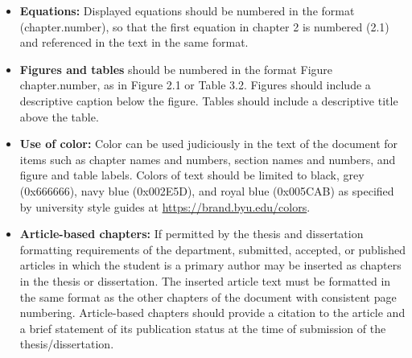 \begin{itemize}
\item {\bfseries Equations:} Displayed equations should be numbered in the format (chapter.number), so that the first equation in chapter 2 is numbered (2.1) and referenced in the text in the same format. 

\item {\bfseries Figures and tables} should be numbered in the format Figure chapter.number, as in Figure 2.1 or Table 3.2. Figures should include a descriptive caption below the figure. Tables should include a descriptive title above the table. 

\item {\bfseries Use of color:} Color can be used judiciously in the text of the document for items such as chapter names and numbers, section names and numbers, and figure and table labels. Colors of text should be limited to black, grey ({\ttfamily 0x666666}), navy blue ({\ttfamily 0x002E5D}), and royal blue ({\ttfamily 0x005CAB}) as specified by university style guides at \url{https://brand.byu.edu/colors}.

\item {\bfseries Article-based chapters:} If permitted by the thesis and dissertation formatting requirements of the department, submitted, accepted, or published articles in which the student is a primary author may be inserted as chapters in the thesis or dissertation. The inserted article text must be formatted in the same format as the other chapters of the document with consistent page numbering. Article-based chapters should provide a citation to the article and a brief statement of its publication status at the time of submission of the thesis/dissertation.
\end{itemize}